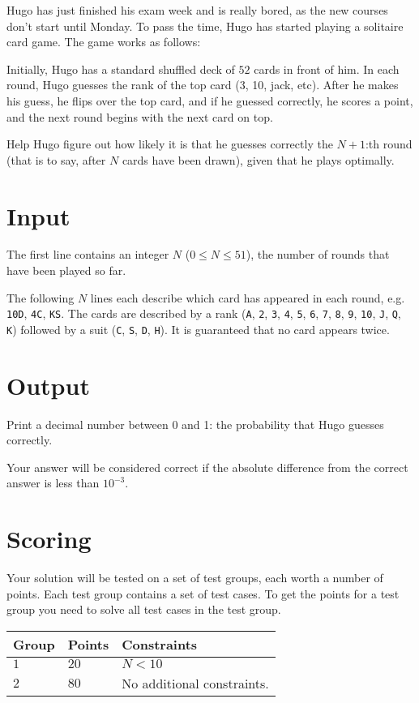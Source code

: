 Hugo has just finished his exam week and is really bored, as the new courses don't start until Monday.
To pass the time, Hugo has started playing a solitaire card game. The game works as follows:

Initially, Hugo has a standard shuffled deck of $52$ cards in front of him. In each round, Hugo guesses the rank of the top card (3, 10, jack, etc).
After he makes his guess, he flips over the top card, and if he guessed correctly, he scores a point, and the next round begins with the next card on top.

Help Hugo figure out how likely it is that he guesses correctly the $N+1$:th round (that is to say, after $N$ cards have been drawn),
given that he plays optimally.

\section*{Input}
The first line contains an integer $N$ ($0 \le N \le 51$), the number of rounds that have been played so far.

The following $N$ lines each describe which card has appeared in each round, e.g. \texttt{10D}, \texttt{4C}, \texttt{KS}.
The cards are described by a rank (\texttt{A}, \texttt{2}, \texttt{3}, \texttt{4}, \texttt{5}, \texttt{6}, \texttt{7}, \texttt{8},
\texttt{9}, \texttt{10}, \texttt{J}, \texttt{Q}, \texttt{K}) followed by a suit (\texttt{C}, \texttt{S}, \texttt{D}, \texttt{H}).
It is guaranteed that no card appears twice.

\section*{Output}
Print a decimal number between 0 and 1: the probability that Hugo guesses correctly.

Your answer will be considered correct if the absolute difference from the correct answer is less than $10^{-3}$.

\section*{Scoring}
Your solution will be tested on a set of test groups, each worth a number of points. Each test group contains
a set of test cases. To get the points for a test group you need to solve all test cases in the test group.

\noindent
\begin{tabular}{| l | l | p{12cm} |}
  \hline
  \textbf{Group} & \textbf{Points} & \textbf{Constraints} \\ \hline
  $1$    & $20$       & $N < 10$ \\ \hline
  $2$    & $80$       & No additional constraints. \\ \hline
\end{tabular}


